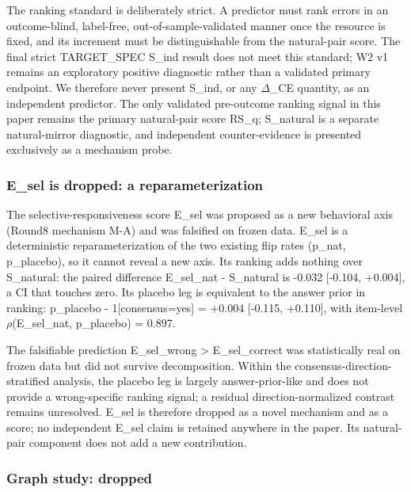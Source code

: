 \documentclass[11pt]{article}
\begin{document}
The ranking standard is deliberately strict. A predictor must rank errors in an outcome-blind, label-free, out-of-sample-validated manner once the resource is fixed, and its increment must be distinguishable from the natural-pair score. The final strict TARGET\_\allowbreak{}SPEC S\_\allowbreak{}ind result does not meet this standard; W2 v1 remains an exploratory positive diagnostic rather than a validated primary endpoint. We therefore never present S\_\allowbreak{}ind, or any $\Delta$\_\allowbreak{}CE quantity, as an independent predictor. The only validated pre-outcome ranking signal in this paper remains the primary natural-pair score RS\_\allowbreak{}q; S\_\allowbreak{}natural is a separate natural-mirror diagnostic, and independent counter-evidence is presented exclusively as a mechanism probe.

\subsubsection{E\_\allowbreak{}sel is dropped: a reparameterization}

The selective-responsiveness score E\_\allowbreak{}sel was proposed as a new behavioral axis (Round8 mechanism M-A) and was falsified on frozen data. E\_\allowbreak{}sel is a deterministic reparameterization of the two existing flip rates (p\_\allowbreak{}nat, p\_\allowbreak{}placebo), so it cannot reveal a new axis. Its ranking adds nothing over S\_\allowbreak{}natural: the paired difference E\_\allowbreak{}sel\_\allowbreak{}nat - S\_\allowbreak{}natural is -0.032 [-0.104, +0.004], a CI that touches zero. Its placebo leg is equivalent to the answer prior in ranking: p\_\allowbreak{}placebo - 1[consensus=yes] = +0.004 [-0.115, +0.110], with item-level $\rho$(E\_\allowbreak{}sel\_\allowbreak{}nat, p\_\allowbreak{}placebo) = 0.897.

The falsifiable prediction E\_\allowbreak{}sel\_\allowbreak{}wrong > E\_\allowbreak{}sel\_\allowbreak{}correct was statistically real on frozen data but did not survive decomposition. Within the consensus-direction-stratified analysis, the placebo leg is largely answer-prior-like and does not provide a wrong-specific ranking signal; a residual direction-normalized contrast remains unresolved. E\_\allowbreak{}sel is therefore dropped as a novel mechanism and as a score; no independent E\_\allowbreak{}sel claim is retained anywhere in the paper. Its natural-pair component does not add a new contribution.

\subsubsection{Graph study: dropped}
\end{document}
